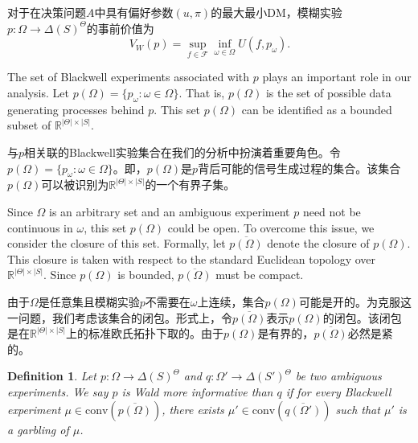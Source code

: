 \documentclass[12pt,a4paper]{article}
\newenvironment{original}
  {\par\vspace{4pt}\noindent\color{black}\ignorespaces}
  {\par\vspace{2pt}}
\newenvironment{translation}
  {\par\vspace{2pt}\noindent\color{myblue}\ignorespaces}
  {\par\vspace{6pt}}
\newtheorem{definition}[theorem]{Definition}
\newcommand{\R}{\mathbb{R}}
\newcommand{\Delt}{\Delta}
\newcommand{\calF}{\mathcal{F}}
\newcommand{\conv}{\mathrm{conv}}
\begin{document}
\begin{translation}
对于在决策问题$A$中具有偏好参数$(u,\pi)$的最大最小DM，模糊实验$p:\Omega\to\Delt(S)^{\Theta}$的事前价值为
\begin{equation}
    V_W(p) = \sup_{f\in\calF} \inf_{\omega\in\Omega} U(f, p_{\omega}).
\end{equation}
\end{translation}

\begin{original}
The set of Blackwell experiments associated with $p$ plays an important role in our analysis. Let $p(\Omega)=\{p_{\omega}:\omega\in\Omega\}$. That is, $p(\Omega)$ is the set of possible data generating processes behind $p$. This set $p(\Omega)$ can be identified as a bounded subset of $\R^{|\Theta|\times|S|}$.
\end{original}

\begin{translation}
与$p$相关联的Blackwell实验集合在我们的分析中扮演着重要角色。令$p(\Omega)=\{p_{\omega}:\omega\in\Omega\}$。即，$p(\Omega)$是$p$背后可能的信号生成过程的集合。该集合$p(\Omega)$可以被识别为$\R^{|\Theta|\times|S|}$的一个有界子集。
\end{translation}

\begin{original}
Since $\Omega$ is an arbitrary set and an ambiguous experiment $p$ need not be continuous in $\omega$, this set $p(\Omega)$ could be open. To overcome this issue, we consider the closure of this set. Formally, let $\overline{p(\Omega)}$ denote the closure of $p(\Omega)$. This closure is taken with respect to the standard Euclidean topology over $\R^{|\Theta|\times|S|}$. Since $p(\Omega)$ is bounded, $\overline{p(\Omega)}$ must be compact.
\end{original}

\begin{translation}
由于$\Omega$是任意集且模糊实验$p$不需要在$\omega$上连续，集合$p(\Omega)$可能是开的。为克服这一问题，我们考虑该集合的闭包。形式上，令$\overline{p(\Omega)}$表示$p(\Omega)$的闭包。该闭包是在$\R^{|\Theta|\times|S|}$上的标准欧氏拓扑下取的。由于$p(\Omega)$是有界的，$\overline{p(\Omega)}$必然是紧的。
\end{translation}

\begin{definition}
Let $p:\Omega\to\Delt(S)^{\Theta}$ and $q:\Omega'\to\Delt(S')^{\Theta}$ be two ambiguous experiments. We say $p$ is Wald more informative than $q$ if for every Blackwell experiment $\mu\in\conv(\overline{p(\Omega)})$, there exists $\mu'\in\conv(\overline{q(\Omega')})$ such that $\mu'$ is a garbling of $\mu$.
\end{definition}
\end{document}
